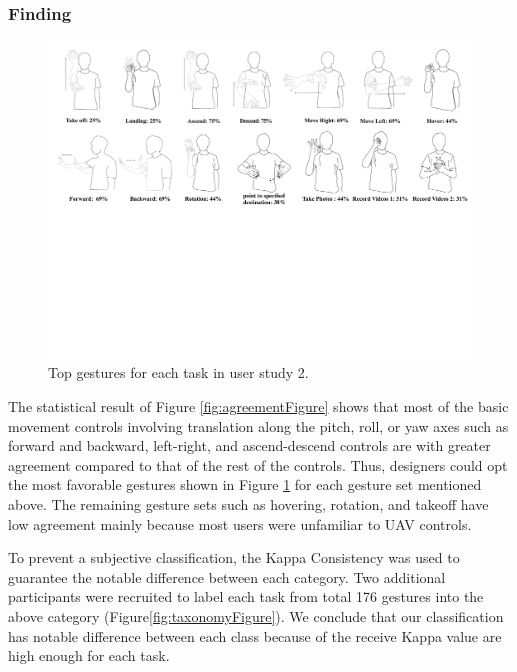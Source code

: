 \documentclass{sigchi}
\begin{document}
\subsubsection{Finding}
\begin{figure}
  \centering
  \includegraphics[width=1\textwidth]{GestureSetFigure1.pdf}
  \caption{Top gestures for each task in user study 2.}
  \label{fig:GestureSetFigure}
  \end{figure}
The statistical result of Figure \ref{fig:agreementFigure} shows that most of the basic movement controls involving translation along the pitch, roll, or yaw axes such as forward and backward, left-right, and ascend-descend controls are with greater agreement compared to that of the rest of the controls. Thus, designers could opt the most favorable gestures shown in Figure \ref{fig:GestureSetFigure} for each gesture set mentioned above. The remaining gesture sets such as hovering, rotation, and takeoff have low agreement mainly because most users were unfamiliar to UAV controls.

To prevent a subjective classification, the Kappa Consistency was used to guarantee the notable difference between each category. Two additional participants were recruited to label each task from total 176 gestures into the above category (Figure\ref{fig:taxonomyFigure}). We conclude that our classification has notable difference between each class because of the receive Kappa value are high enough for each task.



\end{document}
